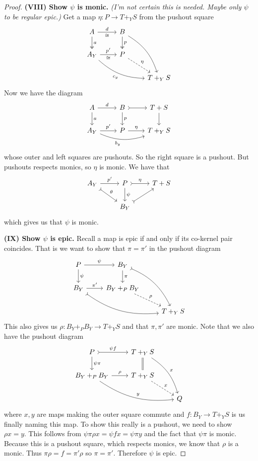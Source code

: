 \documentclass[12pt]{article}
\newcommand{\from}{\colon}
\renewcommand{\(}{\left(}
\renewcommand{\)}{\right)}
\renewcommand{\{}{\left\lbrace}
\renewcommand{\}}{\right\rbrace}
\theoremstyle{remark}
\theoremstyle{definition}
\begin{document}
\begin{proof}
		\textbf{(VIII) Show $\psi$ is monic.}  \textit{(I'm not certain this is needed. Maybe only $\psi$ to be regular epic.)} Get a map $\eta \from P \to T+_YS$ from the pushout square
		\[
		\begin{tikzcd}
		{A} 
		\ar[r,"d", "\cong"']
		\ar[d,twoheadrightarrow,"a"] &
		{B} 
		\ar[d,twoheadrightarrow,"p"] 
		\ar[ddr,bend left=20] &
		{}\\
		{A_Y} 
		\ar[r,"p'","\cong"'] 
		\ar[rrd,bend right=20,"c_y"'] &
		{P} 
		\ar[rd,dashed,"\eta"]\\
		{} &
		{} &
		{T+_YS} 
		\end{tikzcd}
		\]
		Now we have the diagram
		\[
		\begin{tikzcd}
		{A} \ar[r,"d"] \ar[d,"a"] &
		{B} \ar[r,rightarrowtail] \ar[d,"p"] &
		{T+S} \ar[d]\\
		{A_Y} \ar[r,"p'"] \ar[rr,bend right=20, "b_y"'] &
		{P} \ar[r, "\eta"] &
		{T+_YS} 
		\end{tikzcd}
		\]
		whose outer and left squares are pushouts. So the right square is a pushout. But pushouts respects monics, so $\eta$ is monic.  We have that
		\[
		\begin{tikzcd}
		{A_Y} 
		\ar[r,"p'"] 
		\ar[rd,rightarrowtail,"\theta"] &
		{P} 
		\ar[d,"\psi"] 
		\ar[r,rightarrowtail,"\eta"]&
		{T+S} \\
		{} &
		{B_Y} \ar[ur,rightarrowtail] &
		{} 
		\end{tikzcd}
		\]
		which gives us that $\psi$ is monic.  
		
		\textbf{(IX) Show $\psi$ is epic.} Recall a map is epic if and only if its co-kernel pair coincides.  That is we want to show that $\pi=\pi'$ in the pushout diagram
		\[
		\begin{tikzcd}
		{P} \ar[r,"\psi"] \ar[d,"\psi"] &
		{B_Y} \ar[d,"\pi"] \ar[ddr,bend left=20, rightarrowtail] &
		{} \\
		{B_Y} \ar[r,"\pi'"] \ar[rrd, bend right=20,rightarrowtail] &
		{B_Y +_P B_Y} \ar[rd,dashed,"\rho"] &
		{} \\
		{} &
		{} &
		{T+_YS} 
		\end{tikzcd}
		\]
		This also gives us $\rho \from B_Y +_P B_Y \to T+_YS$ and that $\pi,\pi'$ are monic. Note that we also have the pushout diagram
		\[
		\begin{tikzcd}
		{P} 
		\ar[r,rightarrowtail, "\psi f"] 
		\ar[d, "\psi \pi"] &
		{T+_YS} 
		\ar[d,equal] 
		\ar[ddr,bend left=20, "x"] &
		{} \\
		{B_Y +_P B_Y} 
		\ar[r,"\rho"] 
		\ar[rrd, bend right=20,"y"] &
		{T+_YS} 
		\ar[rd,dashed,"x"] &
		{} \\
		{} &
		{} &
		{Q} 
		\end{tikzcd}
		\]
		where $x,y$ are maps making the outer square commute and $f \from B_Y \to T+_YS$ is us finally naming this map. To show this really is a pushout, we need to show $\rho x = y$. This follows from $\psi \pi \rho x =\psi f x = \psi \pi y$ and the fact that $\psi \pi$ is monic.  Because this is a pushout square, which respects monics, we know that $\rho$ is a monic.  Thus $\pi \rho = f = \pi' \rho$ so $\pi = \pi'$.  Therefore $\psi$ is epic.  
		

\end{proof}
\end{document}
